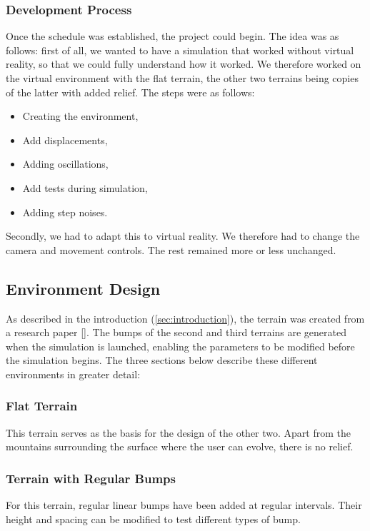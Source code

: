 \documentclass[american]{acmtog} %
\begin{document}
\subsubsection{Development Process}
Once the schedule was established, the project could begin. The idea was as follows: first of all, we wanted to have a simulation that worked without virtual reality, so that we could fully understand how it worked. We therefore worked on the virtual environment with the flat terrain, the other two terrains being copies of the latter with added relief. The steps were as follows:
\begin{itemize}[label=\textbullet]
    \item Creating the environment,
    \item Add displacements,
    \item Adding oscillations,
    \item Add tests during simulation,
    \item Adding step noises.
\end{itemize}
Secondly, we had to adapt this to virtual reality. We therefore had to change the camera and movement controls. The rest remained more or less unchanged.

\subsection{Environment Design}
As described in the introduction (\ref{sec:introduction}), the terrain was created from a research paper [\cite{bumpy_ride}]. The bumps of the second and third terrains are generated when the simulation is launched, enabling the parameters to be modified before the simulation begins. The three sections below describe these different environments in greater detail:

\subsubsection{Flat Terrain}
This terrain serves as the basis for the design of the other two. Apart from the mountains surrounding the surface where the user can evolve, there is no relief.

\subsubsection{Terrain with Regular Bumps}
For this terrain, regular linear bumps have been added at regular intervals. Their height and spacing can be modified to test different types of bump.
\end{document}
